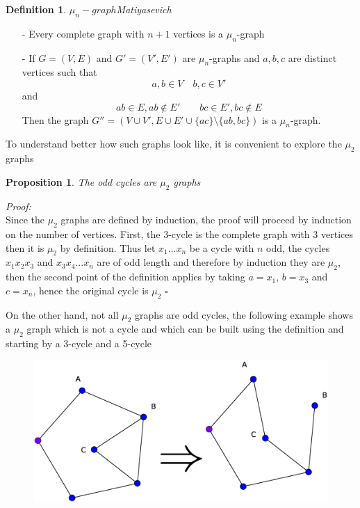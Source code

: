 \documentclass[a4paper,12pt,twoside]{book}
\newtheorem{proposition}[theorem]{Proposition}
\newtheorem{definition}[theorem]{Definition}
\newcommand*{\QED}{\hfill\ensuremath{\square}}
\begin{document}
\begin{definition}
$\mu_n-graph$Matiyasevich
\end{definition}
\begin{itemize}
\item[-] Every complete graph with $n+1$ vertices is a $\mu_n$-graph
\item[-] If $G=(V,E)$ and $G'=(V',E')$ are $\mu_n$-graphs and $a,b,c$ are distinct vertices such that
$$ a,b\in V \quad b,c\in V'  $$
and
$$ ab\in E, ab\notin E' \qquad  bc\in E', bc\notin E$$
Then the graph $G''=(V\cup V', E\cup E'\cup\{ac\} \setminus\{ab,bc\} )$ is a $\mu_n$-graph.
\end{itemize} 
To understand better how such graphs look like, it is convenient to explore the $\mu_2$ graphs
\begin{proposition}
The odd cycles are $\mu_2$ graphs
\end{proposition}
\noindent\textit{Proof:}\\
Since the $\mu_2$ graphs are defined by induction, the proof will proceed by induction on the number of vertices.
First, the 3-cycle is the complete graph with 3 vertices then it is $\mu_2$ by definition. Thus let $x_1...x_n$ be a cycle with $n$ odd, the cycles $x_1x_2x_3$ and $x_3x_4...x_n$ are of odd length and therefore by induction they are $\mu_2$, then the second point of the definition applies by taking 	$a=x_1$, $b=x_3$ and $c=x_n$, hence the original cycle is $\mu_2$
\QED

\noindent On the other hand, not all $\mu_2$ graphs are odd cycles, the following example shows a $\mu_2$ graph which is not a cycle and which can be built using the definition and starting by a 3-cycle and a 5-cycle 
\begin{figure}[h]
\centering\includegraphics[scale=0.25]{mu2.eps}
\end{figure}
\end{document}
